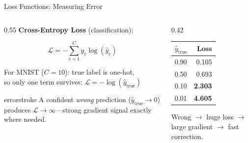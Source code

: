 \documentclass[aspectratio=169, 12pt]{beamer}
\begin{document}
\begin{frame}{Loss Functions: Measuring Error}

\small
\begin{columns}[T]
  \begin{column}{0.55\textwidth}
    \textbf{Cross-Entropy Loss} (classification):

    \vspace{0.1cm}
    $$\mathcal{L} = -\sum_{c=1}^{C} y_c \log(\hat{y}_c)$$

    \vspace{0.1cm}
    For MNIST ($C = 10$): true label is one-hot,\\
    so only one term survives: $\mathcal{L} = -\log(\hat{y}_{\text{true}})$

    \vspace{0.15cm}
    \begin{mlsyscard}{errorstroke}
    {\footnotesize A confident \emph{wrong} prediction ($\hat{y}_{\text{true}} \to 0$) produces $\mathcal{L} \to \infty$---strong gradient signal exactly where needed.}
    \end{mlsyscard}
  \end{column}
  \begin{column}{0.42\textwidth}
    \vspace{0.2cm}
    \renewcommand{\arraystretch}{1.15}
    {\footnotesize
    \begin{tabular}{@{}lr@{}}
      \toprule
      $\hat{y}_{\text{true}}$ & Loss \\
      \midrule
      0.90 & 0.105 \\
      0.50 & 0.693 \\
      0.10 & \textcolor{errorstroke}{\textbf{2.303}} \\
      0.01 & \textcolor{errorstroke}{\textbf{4.605}} \\
      \bottomrule
    \end{tabular}
    }

    \vspace{0.1cm}
    {\footnotesize Wrong $\to$ huge loss $\to$ large gradient $\to$ fast correction.}
  \end{column}
\end{columns}

\end{frame}
\end{document}
